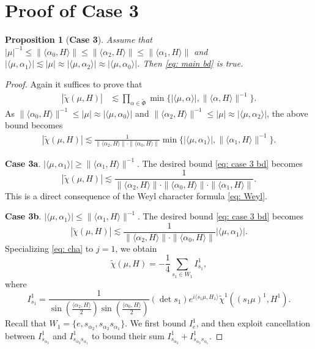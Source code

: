 \documentclass{amsart}
\numberwithin{equation}{section}
\newtheorem{prop}[thm]{Proposition}
\numberwithin{equation}{section}
\begin{document}
\section{Proof of \textbf{Case 3}}\label{sec: case 3}
\begin{prop}[\textbf{Case 3}]\label{prop: case 3}
    Assume that $|\mu|^{-1}\leq \|\langle\alpha_0,H\rangle\|\leq \|\langle\alpha_2,H\rangle\|\leq \|\langle\alpha_1,H\rangle\|$ and $| \langle\mu,\alpha_1\rangle|\lesssim |\mu|\approx |\langle\mu,\alpha_2\rangle|\approx |\langle\mu,\alpha_0\rangle|$. Then \eqref{eq: main bd} is true. 
\end{prop}
\begin{proof}
Again it suffices to prove that 
\begin{align*}
|\widetilde{\chi}(\mu, H)|&\lesssim 
\prod_{\alpha\in\widetilde{\Phi}}\min\{|\langle\mu,\alpha\rangle|,\|\langle\alpha,H\rangle\|^{-1}\}.
\end{align*}
As $\|\langle\alpha_0, H\rangle\|^{-1}\leq |\mu|\approx|\langle\mu,\alpha_0\rangle|$ and $\|\langle\alpha_2, H\rangle\|^{-1}\leq|\mu|\approx|\langle\mu,\alpha_2\rangle|$, the above bound becomes 
\begin{align}\label{eq: case 3 bd}
    |\widetilde{\chi}(\mu, H)|\lesssim \frac{1}{\|\langle\alpha_2,H\rangle\|\cdot \|\langle\alpha_0,H\rangle\|}\min\{|\langle\mu,\alpha_1\rangle|,\|\langle\alpha_1,H\rangle\|^{-1}\}.
\end{align}


\textbf{Case 3a}. $|\langle\mu,\alpha_1\rangle|\geq\|\langle\alpha_1,H\rangle\|^{-1}$. The desired bound \eqref{eq: case 3 bd} becomes 
$$|\widetilde{\chi}(\mu, H)|\lesssim \frac{1}{\|\langle\alpha_2,H\rangle\|\cdot\|\langle\alpha_0,H\rangle\|\cdot\|\langle\alpha_1,H\rangle\|}.$$
This is a direct consequence of the Weyl character formula \eqref{eq: Weyl}. 

\textbf{Case 3b}. $|\langle\mu,\alpha_1\rangle|\leq\|\langle\alpha_1,H\rangle\|^{-1}$. 
 The desired bound \eqref{eq: case 3 bd} becomes 
$$|\widetilde{\chi}(\mu, H)|\lesssim \frac{1}{\|\langle\alpha_2,H\rangle\|\cdot\|\langle\alpha_0,H\rangle\|}|\langle\mu,\alpha_1\rangle|.$$
   Specializing \eqref{eq: cha} to $j=1$, we obtain
   $$
   \widetilde{\chi}(\mu, H)=-\frac{1}{4}\sum_{s_1\in W_1}I^1_{s_1},
   $$
   where 
   $$
   I^1_{s_1}=
   \frac{1}{\sin\left(\frac{\langle\alpha_2, H\rangle}{2}\right)\sin\left(\frac{\langle\alpha_0, H\rangle}{2}\right)}(\det s_1) 
e^{i\langle s_1\mu, H_{1}\rangle}\widetilde{\chi}^1({(s_1\mu)^1}, H^1).
$$
Recall that $W_1=\{e,s_{\alpha_2},s_{\alpha_2}s_{\alpha_1}\}$. 
We first bound $I^1_{e}$, and then exploit cancellation between $I^1_{s_{\alpha_2}}$ and $I^1_{s_{\alpha_2}s_{\alpha_1}}$ to bound their sum $I^1_{s_{\alpha_2}}+I^1_{s_{\alpha_2}s_{\alpha_1}}$. 




\end{proof}
\end{document}
